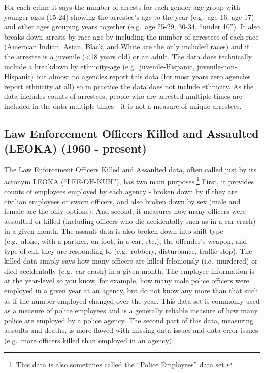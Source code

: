 \documentclass[
]{krantz}
\begin{document}
For each crime it says the number of arrests for each
gender-age group with younger ages (15-24) showing the
arrestee's age to the year (e.g.~age 16, age 17) and other
ages grouping years together (e.g.~age 25-29, 30-34, ``under
10''). It also breaks down arrests by race-age by including
the number of arrestees of each race (American Indian,
Asian, Black, and White are the only included races) and if
the arrestee is a juvenile (\textless18 years old) or an
adult. The data does technically include a breakdown by
ethnicity-age (e.g.~juvenile-Hispanic,
juvenile-non-Hispanic) but almost no agencies report this
data (for most years zero agencies report ethnicity at all)
so in practice the data does not include ethnicity. As the
data includes counts of arrestees, people who are arrested
multiple times are included in the data multiple times - it
is not a measure of unique arrestees.

\subsection{Law Enforcement Officers Killed and Assaulted
(LEOKA) (1960 -
present)}\label{law-enforcement-officers-killed-and-assaulted-leoka-1960---present}

The Law Enforcement Officers Killed and Assaulted data,
often called just by its acronym LEOKA (``LEE-OH-KUH''), has
two main purposes.\footnote{This data is also sometimes
  called the ``Police Employees'' data set.} First, it
provides counts of employees employed by each agency -
broken down by if they are civilian employees or sworn
officers, and also broken down by sex (male and female are
the only options). And second, it measures how many officers
were assaulted or killed (including officers who die
accidentally such as in a car crash) in a given month. The
assault data is also broken down into shift type
(e.g.~alone, with a partner, on foot, in a car, etc.), the
offender's weapon, and type of call they are responding to
(e.g.~robbery, disturbance, traffic stop). The killed data
simply says how many officers are killed feloniously
(i.e.~murdered) or died accidentally (e.g.~car crash) in a
given month. The employee information is at the year-level
so you know, for example, how many male police officers were
employed in a given year at an agency, but do not know any
more than that such as if the number employed changed over
the year. This data set is commonly used as a measure of
police employees and is a generally reliable measure of how
many police are employed by a police agency. The second part
of this data, measuring assaults and deaths, is more flawed
with missing data issues and data error issues (e.g.~more
officers killed than employed in an agency).
\end{document}
